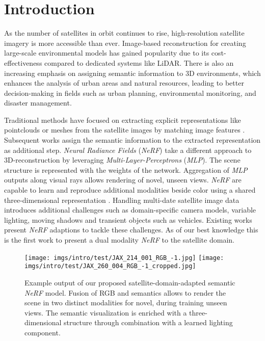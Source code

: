 \section{Introduction}



As the number of satellites in orbit continues to rise, high-resolution satellite imagery is more accessible than ever. Image-based reconstruction for creating large-scale environmental models has gained popularity due to its cost-effectiveness compared to dedicated systems like LiDAR. There is also an increasing emphasis on assigning semantic information to 3D environments, which enhances the analysis of urban areas and natural resources, leading to better decision-making in fields such as urban planning, environmental monitoring, and disaster management. 


Traditional methods have focused on extracting explicit representations like pointclouds or meshes from the satellite images by matching image features \cite{s2p,ames,vissat,ssr}.
Subsequent works \cite{pointnet++,pt3,kpconv} assign the semantic information to the extracted representation as additional step.
\emph{Neural Radiance Fields} (\emph{NeRF}) \cite{nerf} take a different approach to 3D-reconstruction by leveraging \emph{Multi-Layer-Perceptrons} (\emph{MLP}). 
The scene structure is represented with the weights of the network. 
Aggregation of \emph{MLP} outputs along visual rays allows rendering of novel, unseen views.
\emph{NeRF} are capable to learn and reproduce additional modalities beside color using a shared three-dimensional representation \cite{semanticnerf,beyondrgb}.
Handling multi-date satellite image data introduces additional challenges such as domain-specific camera models, variable lighting, moving shadows and transient objects such as vehicles. 
Existing works \cite{snerf,satnerf,eonerf,sundial} present \emph{NeRF} adaptions to tackle these challenges.
As of our best knowledge this is the first work to present a dual modality \emph{NeRF} to the satellite domain.

\begin{figure}[t]
	\centering
	\texttt{[image: imgs/intro/test/JAX\_214\_001\_RGB\_-1.jpg]}
	\hfil
	\texttt{[image: imgs/intro/test/JAX\_260\_004\_RGB\_-1\_cropped.jpg]}
	\caption{Example output of our proposed satellite-domain-adapted semantic \emph{NeRF} model. Fusion of RGB and semantics allows to render the scene in two distinct modalities for novel, during training unseen views. The semantic visualization is enriched with a three-dimensional structure through combination with a learned lighting component.}
	\label{fig:intro_figure}
\end{figure}

